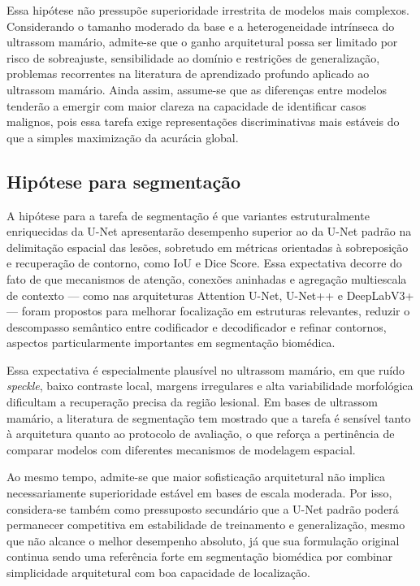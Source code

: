 \documentclass[tcc,capa]{texufpel}
\begin{document}
Essa hipótese não pressupõe superioridade irrestrita de modelos mais complexos. Considerando o tamanho moderado da base e a heterogeneidade intrínseca do ultrassom mamário, admite-se que o ganho arquitetural possa ser limitado por risco de sobreajuste, sensibilidade ao domínio e restrições de generalização, problemas recorrentes na literatura de aprendizado profundo aplicado ao ultrassom mamário. Ainda assim, assume-se que as diferenças entre modelos tenderão a emergir com maior clareza na capacidade de identificar casos malignos, pois essa tarefa exige representações discriminativas mais estáveis do que a simples maximização da acurácia global. \cite{Dan2024,Liu2025AIBUS,Guo2018}

\subsection{Hipótese para segmentação}

A hipótese para a tarefa de segmentação é que variantes estruturalmente enriquecidas da U-Net apresentarão desempenho superior ao da U-Net padrão na delimitação espacial das lesões, sobretudo em métricas orientadas à sobreposição e recuperação de contorno, como IoU e Dice Score. Essa expectativa decorre do fato de que mecanismos de atenção, conexões aninhadas e agregação multiescala de contexto --- como nas arquiteturas Attention U-Net, U-Net++ e DeepLabV3+ --- foram propostos para melhorar focalização em estruturas relevantes, reduzir o descompasso semântico entre codificador e decodificador e refinar contornos, aspectos particularmente importantes em segmentação biomédica. \cite{Ronneberger2015,Oktay2018,Zhou2018UNetPP,Chen2018DeepLabV3Plus}

Essa expectativa é especialmente plausível no ultrassom mamário, em que ruído \textit{speckle}, baixo contraste local, margens irregulares e alta variabilidade morfológica dificultam a recuperação precisa da região lesional. Em bases de ultrassom mamário, a literatura de segmentação tem mostrado que a tarefa é sensível tanto à arquitetura quanto ao protocolo de avaliação, o que reforça a pertinência de comparar modelos com diferentes mecanismos de modelagem espacial. \cite{Zhang2022BUSIS,Liu2018BUSSegment,Guo2018}

Ao mesmo tempo, admite-se que maior sofisticação arquitetural não implica necessariamente superioridade estável em bases de escala moderada. Por isso, considera-se também como pressuposto secundário que a U-Net padrão poderá permanecer competitiva em estabilidade de treinamento e generalização, mesmo que não alcance o melhor desempenho absoluto, já que sua formulação original continua sendo uma referência forte em segmentação biomédica por combinar simplicidade arquitetural com boa capacidade de localização. \cite{Ronneberger2015,Renard2020}
\end{document}
